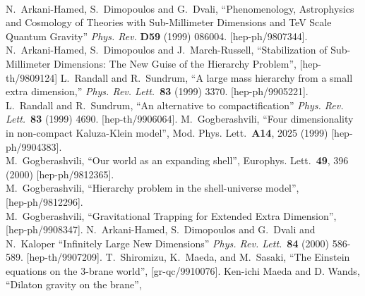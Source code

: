 \documentclass[a4paper,10pt]{article}
\begin{document}
\begin{thebibliography}{99}
\\
N.~Arkani-Hamed, S.~Dimopoulos and G.~Dvali,
``Phenomenology, Astrophysics and Cosmology of Theories with 
Sub-Millimeter Dimensions and TeV Scale Quantum Gravity''
{\it Phys.  Rev.} {\bf D59} (1999) 086004.
[hep-ph/9807344].
\\
N.~Arkani-Hamed, S.~Dimopoulos and J.~March-Russell,
``Stabilization of Sub-Millimeter Dimensions: The New Guise 
of the Hierarchy Problem'',
[hep-th/9809124] 
L.~Randall and R.~Sundrum,
``A large mass hierarchy from a small extra dimension,''
{\it Phys.  Rev.  Lett.}\ {\bf 83} (1999) 3370. 
[hep-ph/9905221].
\\
L.~Randall and R.~Sundrum,
``An alternative to compactification''
{\it Phys.  Rev.  Lett.}\ {\bf 83} (1999) 4690.
[hep-th/9906064].
M.~Gogberashvili,
``Four dimensionality in non-compact Kaluza-Klein model'',
Mod.  Phys.  Lett.\  {\bf A14}, 2025 (1999)
[hep-ph/9904383].
\\
M.~Gogberashvili,
``Our world as an expanding shell'',
Europhys.  Lett.\  {\bf 49}, 396 (2000)
[hep-ph/9812365].
\\
M.~Gogberashvili,
``Hierarchy problem in the shell-universe model'',\\{}
[hep-ph/9812296].
\\
M.~Gogberashvili,
``Gravitational Trapping for Extended Extra Dimension'',\\{}
[hep-ph/9908347].
N.~Arkani-Hamed, S.~Dimopoulos and G.~Dvali and N.~Kaloper
``Infinitely Large New Dimensions''
{\it Phys.  Rev.  Lett.}\ {\bf 84} (2000) 586-589.
[hep-th/9907209].
T.~Shiromizu, K.~Maeda, and M.~Sasaki,
``The Einstein equations on the 3-brane world'',
[gr-qc/9910076].
Ken-ichi Maeda and D. Wands,
``Dilaton gravity on the brane'',

\end{thebibliography}
\end{document}
